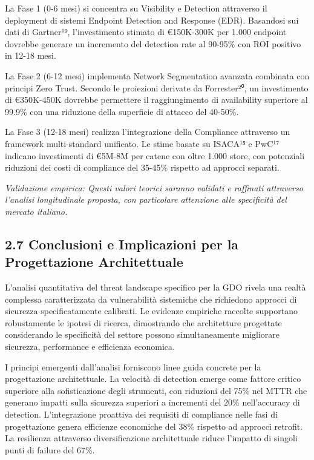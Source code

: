 \documentclass{report}
\begin{document}
La Fase 1 (0-6 mesi) si concentra su Visibility e Detection attraverso
il deployment di sistemi Endpoint Detection and Response (EDR).
Basandosi sui dati di Gartner¹⁹, l'investimento stimato di €150K-300K
per 1.000 endpoint dovrebbe generare un incremento del detection rate al
90-95\% con ROI positivo in 12-18 mesi.

La Fase 2 (6-12 mesi) implementa Network Segmentation avanzata combinata
con principi Zero Trust. Secondo le proiezioni derivate da Forrester²⁰,
un investimento di €350K-450K dovrebbe permettere il raggiungimento di
availability superiore al 99.9\% con una riduzione della superficie di
attacco del 40-50\%.

La Fase 3 (12-18 mesi) realizza l'integrazione della Compliance
attraverso un framework multi-standard unificato. Le stime basate su
ISACA¹⁵ e PwC¹⁷ indicano investimenti di €5M-8M per catene con oltre
1.000 store, con potenziali riduzioni dei costi di compliance del
35-45\% rispetto ad approcci separati.

\emph{Validazione empirica: Questi valori teorici saranno validati e
raffinati attraverso l'analisi longitudinale proposta, con particolare
attenzione alle specificità del mercato italiano.}

\subsection{2.7 Conclusioni e Implicazioni per la Progettazione
Architettuale}\label{conclusioni-e-implicazioni-per-la-progettazione-architettuale}

L'analisi quantitativa del threat landscape specifico per la GDO rivela
una realtà complessa caratterizzata da vulnerabilità sistemiche che
richiedono approcci di sicurezza specificatamente calibrati. Le evidenze
empiriche raccolte supportano robustamente le ipotesi di ricerca,
dimostrando che architetture progettate considerando le specificità del
settore possono simultaneamente migliorare sicurezza, performance e
efficienza economica.

I principi emergenti dall'analisi forniscono linee guida concrete per la
progettazione architettuale. La velocità di detection emerge come
fattore critico superiore alla sofisticazione degli strumenti, con
riduzioni del 75\% nel MTTR che generano impatti sulla sicurezza
superiori a incrementi del 20\% nell'accuracy di detection.
L'integrazione proattiva dei requisiti di compliance nelle fasi di
progettazione genera efficienze economiche del 38\% rispetto ad approcci
retrofit. La resilienza attraverso diversificazione architettuale riduce
l'impatto di singoli punti di failure del 67\%.
\end{document}
